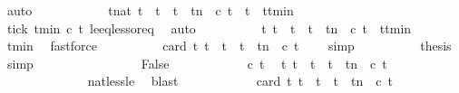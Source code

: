 \begin{isabellebody}
\ auto\isanewline
\ \ \ \ \ \ \ \ \isamarkupfalse%
\ \isamarkupfalse%
\ {\isacartoucheopen}{\isasymforall}t{\isacharprime}{\isacharcolon}{\isacharcolon}nat{\isachardot}\ {\isacharparenleft}t\ {\isasymle}\ t{\isacharprime}\ {\isasymand}\ t{\isacharprime}\ {\isasymle}\ t{\isacharplus}n\ {\isasymand}\ c\ t{\isacharprime}{\isacharparenright}\ {\isasymlongrightarrow}\ t{\isacharprime}\ {\isacharequal}\ ttmin{\isacartoucheclose}\isanewline
\ \ \ \ \ \ \ \ \ \ \isamarkupfalse%
\ tick\ tmin\ {\isacartoucheopen}{\isasymnot}c\ t{\isacartoucheclose}\ le{\isacharunderscore}eq{\isacharunderscore}less{\isacharunderscore}or{\isacharunderscore}eq\ \isamarkupfalse%
\ auto\isanewline
\ \ \ \ \ \ \ \ \isamarkupfalse%
\ {\isacartoucheopen}{\isacharbraceleft}t{\isacharprime}{\isachardot}\ t\ {\isasymle}\ t{\isacharprime}\ {\isasymand}\ t{\isacharprime}\ {\isasymle}\ t{\isacharplus}n\ {\isasymand}\ c\ t{\isacharprime}{\isacharbraceright}\ {\isacharequal}\ {\isacharbraceleft}ttmin{\isacharbraceright}{\isacartoucheclose}\ \isamarkupfalse%
\ tmin\ \isamarkupfalse%
\ fastforce\isanewline
\ \ \ \ \ \ \ \ \isamarkupfalse%
\ {\isacartoucheopen}card\ {\isacharbraceleft}t{\isacharprime}{\isachardot}\ t\ {\isasymle}\ t{\isacharprime}\ {\isasymand}\ t{\isacharprime}\ {\isasymle}\ t{\isacharplus}n\ {\isasymand}\ c\ t{\isacharprime}{\isacharbraceright}\ {\isacharequal}\ {}{\isacartoucheclose}\ \isamarkupfalse%
\ simp\isanewline
\ \ \ \ \ \ \ \ \isamarkupfalse%
\ {\isacharquery}thesis\ \isamarkupfalse%
\ simp\isanewline
\ \ \ \ \ \ \isamarkupfalse%
\isanewline
\ \ \ \ \ \ \ \ \isamarkupfalse%
\ False\isanewline
\ \ \ \ \ \ \ \ \ \ \isamarkupfalse%
\ {\isacartoucheopen}{\isasymnot}c\ t{\isacartoucheclose}\ \isamarkupfalse%
\ {\isacartoucheopen}{\isasymforall}t{\isacharprime}{\isachardot}\ t\ {\isasymle}\ t{\isacharprime}\ {\isasymand}\ t{\isacharprime}\ {\isasymle}\ t{\isacharplus}n\ {\isasymlongrightarrow}\ {\isasymnot}c\ t{\isacharprime}{\isacartoucheclose}\ \isanewline
\ \ \ \ \ \ \ \ \ \ \ \ \isamarkupfalse%
\ nat{\isacharunderscore}less{\isacharunderscore}le\ \isamarkupfalse%
\ blast\isanewline
\ \ \ \ \ \ \ \ \ \ \isamarkupfalse%
\ {\isacartoucheopen}card\ {\isacharbraceleft}t{\isacharprime}{\isachardot}\ t\ {\isasymle}\ t{\isacharprime}\ {\isasymand}\ t{\isacharprime}\ {\isasymle}\ t{\isacharplus}n\ {\isasymand}\ c\ t{\isacharprime}{\isacharbraceright}\ {\isacharequal}\ {}{\isacartoucheclose}\ \isamarkupfalse%

\end{isabellebody}
